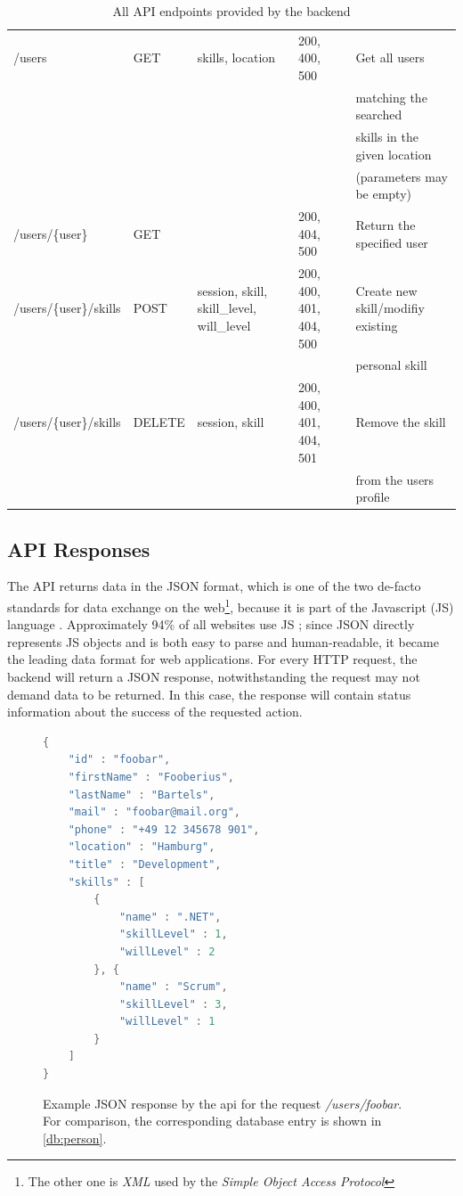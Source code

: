 \begin{table}[p]
{\begin{tabular}{l|l|l|l|l}
  /users               & GET    & skills, location                            & 200, 400, 500           & Get all users\\ & & & &  matching the searched\\ & & & & skills in the given location\\ & & & & (parameters may be empty)\\ \hline
  /users/\{user\}        & GET    &                                             & 200, 404, 500           & Return the specified user\\ \hline
  /users/\{user\}/skills & POST   & session, skill, skill\_level, will\_level & 200, 400, 401, 404, 500 & Create new skill/modifiy existing\\ & & & & personal skill\\ \hline
  /users/\{user\}/skills & DELETE & session, skill                              & 200, 400, 401, 404, 501 & Remove the skill\\ & & & & from the users profile\\
  \end{tabular}
  }
\caption[API Endpoints]{All API endpoints provided by the backend}
\label{swaggertable}
\end{table}
\newpage

\subsection{API Responses}
The API returns data in the JSON format, which is one of the two de-facto standards for data exchange on the web\footnote{The other one is \textit{XML} used by the \textit{Simple Object Access Protocol}}, because it is part of the Javascript (JS) language \cite[p. 37]{json}. Approximately 94\% of all websites use JS \cite{jsmarket}; since JSON directly represents JS objects and is both easy to parse and human-readable, it became the leading data format for web applications.
For every HTTP request, the backend will return a JSON response, notwithstanding the request may not demand data to be returned. In this case, the response will contain status information about the success of the requested action.

\begin{figure}[h]
\begin{lstlisting}[language=Java]
{
	"id" : "foobar",
	"firstName" : "Fooberius",
	"lastName" : "Bartels",
	"mail" : "foobar@mail.org",
	"phone" : "+49 12 345678 901",
	"location" : "Hamburg",
	"title" : "Development",
	"skills" : [
		{
			"name" : ".NET",
			"skillLevel" : 1,
			"willLevel" : 2
		}, {
			"name" : "Scrum",
			"skillLevel" : 3,
			"willLevel" : 1
		}
	]
}
\end{lstlisting}
\caption[Person API Response]{Example JSON response by the api for the request \textit{/users/foobar}. For comparison, the corresponding database entry is shown in \ref{db:person}.}
\end{figure}


